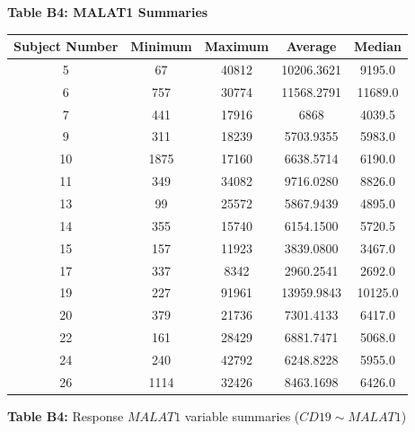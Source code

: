 \documentclass[12pt,]{article}
\begin{document}
\begin{center}

\textbf{\large{Table B4: MALAT1 Summaries}}

\begin{scriptsize}
\begin{tabular}{|c|c|c|c|c|}
\hline 
Subject Number & Minimum & Maximum & Average & Median \\ 
\hline
\hline
5  & 67 & 40812 & 10206.3621 & 9195.0 \\ 
\hline 
6  & 757 & 30774 & 11568.2791 & 11689.0 \\ 
\hline 
7  & 441 & 17916 & 6868 & 4039.5 \\ 
\hline 
9  & 311 & 18239 & 5703.9355 & 5983.0 \\ 
\hline 
10 & 1875 & 17160 & 6638.5714 & 6190.0 \\ 
\hline
11 & 349 & 34082 & 9716.0280 & 8826.0 \\ 
\hline 
13 & 99 & 25572 & 5867.9439 & 4895.0 \\ 
\hline 
14 & 355 & 15740 & 6154.1500 & 5720.5 \\ 
\hline 
15 & 157 & 11923 & 3839.0800 & 3467.0 \\ 
\hline 
17 & 337 & 8342 & 2960.2541 & 2692.0 \\ 
\hline 
19 & 227 & 91961 & 13959.9843 & 10125.0 \\ 
\hline 
20 & 379 & 21736 & 7301.4133 & 6417.0 \\ 
\hline 
22 & 161 & 28429 & 6881.7471 & 5068.0 \\ 
\hline 
24 & 240 & 42792 & 6248.8228 & 5955.0 \\ 
\hline 
26 & 1114 & 32426 & 8463.1698 & 6426.0 \\ 
\hline  
\end{tabular}

\vspace{5pt}

\textbf{Table B4:} Response $MALAT1$ variable summaries ($CD19 \sim MALAT1$)

\end{scriptsize}
\end{center}

\newpage
\end{document}
